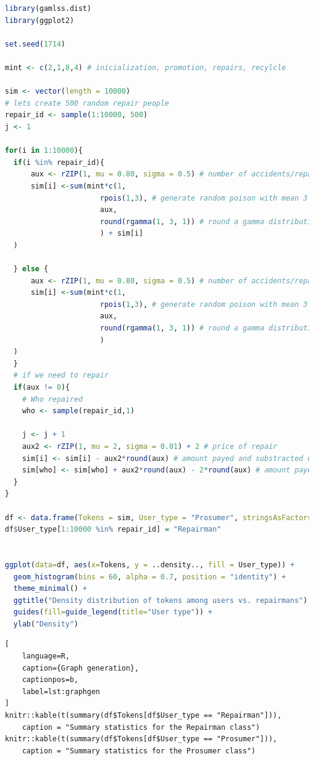 \documentclass[11pt]{scrartcl}
\begin{document}
\begin{lstlisting}[language=R,caption={Simulation},captionpos=b,label=lst:sim]
library(gamlss.dist)
library(ggplot2)

set.seed(1714)

mint <- c(2,1,8,4) # inicialization, promotion, repairs, recylcle

sim <- vector(length = 10000)
# lets create 500 random repair people
repair_id <- sample(1:10000, 500)
j <- 1

for(i in 1:10000){
  if(i %in% repair_id){
      aux <- rZIP(1, mu = 0.80, sigma = 0.5) # number of accidents/repairs
      sim[i] <-sum(mint*c(1,
                      rpois(1,3), # generate random poison with mean 3
                      aux,
                      round(rgamma(1, 3, 1)) # round a gamma distribution with rate 3 and scale 1
                      ) + sim[i]
  )

  } else {
      aux <- rZIP(1, mu = 0.80, sigma = 0.5) # number of accidents/repairs
      sim[i] <-sum(mint*c(1,
                      rpois(1,3), # generate random poison with mean 3
                      aux,
                      round(rgamma(1, 3, 1)) # round a gamma distribution with rate 3 and scale 1
                      )
  )
  }
  # if we need to repair
  if(aux != 0){
    # Who repaired
    who <- sample(repair_id,1)

    j <- j + 1
    aux2 <- rZIP(1, mu = 2, sigma = 0.01) + 2 # price of repair
    sim[i] <- sim[i] - aux2*round(aux) # amount payed and substracted user
    sim[who] <- sim[who] + aux2*round(aux) - 2*round(aux) # amount payed to repairman
  }
}

df <- data.frame(Tokens = sim, User_type = "Prosumer", stringsAsFactors = F)
df$User_type[1:10000 %in% repair_id] = "Repairman"


ggplot(data=df, aes(x=Tokens, y = ..density.., fill = User_type)) +
  geom_histogram(bins = 60, alpha = 0.7, position = "identity") +
  theme_minimal() +
  ggtitle("Density distribution of tokens among users vs. repairmans") +
  guides(fill=guide_legend(title="User type")) +
  ylab("Density")
\end{lstlisting}

\begin{lstlisting}[
    language=R,
    caption={Graph generation},
    captionpos=b,
    label=lst:graphgen
]
knitr::kable(t(summary(df$Tokens[df$User_type == "Repairman"])),
    caption = "Summary statistics for the Repairman class")
knitr::kable(t(summary(df$Tokens[df$User_type == "Prosumer"])),
    caption = "Summary statistics for the Prosumer class")
\end{lstlisting}
\end{document}
